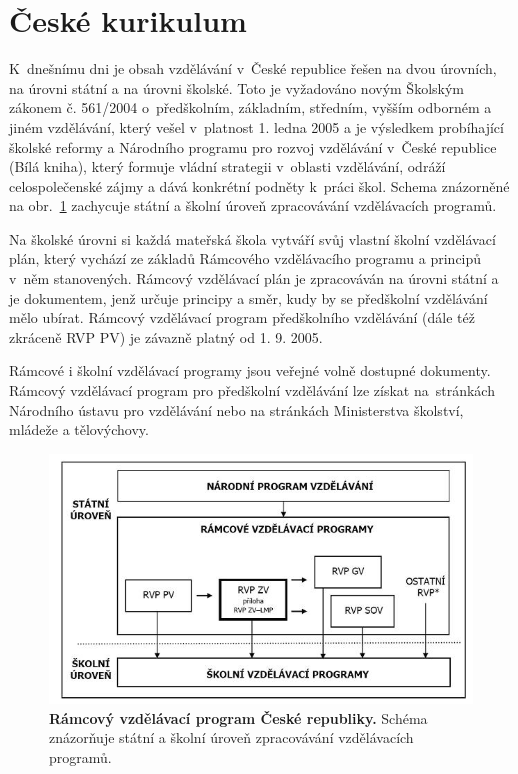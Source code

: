 	\section{České kurikulum}

		K dnešnímu dni je obsah vzdělávání v České republice řešen na dvou úrovních, na úrovni státní a na úrovni školské. Toto je vyžadováno novým Školským zákonem č. 561/2004 o~předškolním, základním, středním, vyšším odborném a jiném vzdělávání, který vešel v platnost 1. ledna 2005 a je výsledkem probíhající školské reformy a Národního programu pro rozvoj vzdělávání v České republice (Bílá kniha), který formuje vládní strategii v oblasti vzdělávání, odráží celospolečenské zájmy a dává konkrétní podněty k práci škol. Schema znázorněné na obr.~\ref{obr:rvpCR} zachycuje státní a školní úroveň zpracovávání vzdělávacích programů.

		Na školské úrovni si každá mateřská škola vytváří svůj vlastní školní vzdělávací plán, který vychází ze základů Rámcového vzdělávacího programu a principů v něm stanovených. Rámcový vzdělávací plán je zpracováván na úrovni státní a je dokumentem, jenž určuje principy a směr, kudy by se předškolní vzdělávání mělo ubírat. Rámcový vzdělávací program předškolního vzdělávání (dále též zkráceně RVP PV) je závazně platný od 1. 9. 2005.

		Rámcové i školní vzdělávací programy jsou veřejné volně dostupné dokumenty. Rámcový vzdělávací program pro předškolní vzdělávání lze získat na stránkách Národního ústavu pro vzdělávání \citep{RVP} nebo na stránkách Ministerstva školství, mládeže a tělovýchovy.

		
		\begin{figure}[h]
			\vspace{15mm}
			\center
			\includegraphics[width=0.8\linewidth]{fotky/rvpCR.jpg}
			\caption{
				\textbf{Rámcový vzdělávací program České republiky.}
				Schéma znázorňuje státní a školní úroveň zpracovávání vzdělávacích programů.
			}
			\label{obr:rvpCR}
		\end{figure}

